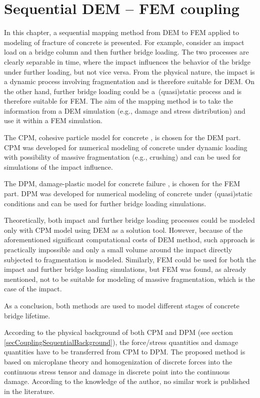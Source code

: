 \chapter{Sequential DEM -- FEM coupling}\label{chapCouplingSequential}
In this chapter, a sequential mapping method from DEM to FEM applied to modeling of fracture of concrete is presented.
For example, consider
an impact load on a bridge column
and then
further bridge loading.
The two processes are clearly separable in time, where
the impact
influences
the behavior of the bridge under further loading,
but not vice versa.
From the physical nature,
the impact
is a dynamic process involving fragmentation and is therefore suitable for DEM.
On the other hand,
further bridge loading
could be a~(quasi)static  process and is therefore suitable for FEM.
The aim of the mapping method is to take the information from a DEM simulation (e.g., damage and stress distribution) and use it within a FEM simulation.

The CPM, cohesive particle model for concrete \cite{Smilauer2010a}, is chosen for the DEM part.
CPM was developed for numerical modeling of concrete under dynamic loading with possibility of massive fragmentation (e.g., crushing) and can be used for simulations of
the impact influence.

The DPM, damage-plastic model for concrete failure \cite{GrasslJirasek2010a}, is chosen for the FEM part.
DPM was developed for numerical modeling of concrete under (quasi)static conditions and can be used for
further bridge loading
simulations.

Theoretically, both
impact
and
further bridge loading
processes could be modeled only with CPM model using DEM as a solution tool.
However, because of the aforementioned significant computational costs of DEM method, such approach is practically impossible and only a small volume around
the impact
directly subjected to fragmentation is modeled.
Similarly, FEM could be used for both
the impact
and
further bridge loading
simulations, but FEM was found, as already mentioned, not to be suitable for modeling of massive fragmentation, which is the case of
the impact.

As a conclusion, both methods are used to model different stages of concrete
bridge
lifetime.

According to the physical background of both CPM and DPM (see section \ref{secCouplingSequentialBackground}), the force/stress quantities and damage quantities have to be transferred from CPM to DPM.
The proposed method is based on microplane theory and homogenization of discrete forces into the continuous stress tensor and damage in discrete point into the continuous damage.
According to the knowledge of the author, no similar work is published in the literature.

